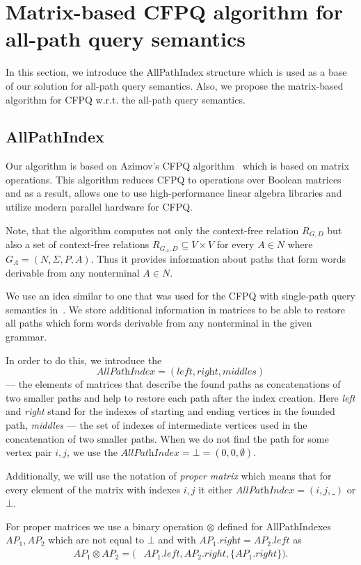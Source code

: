 \section{Matrix-based CFPQ algorithm for all-path query semantics}
\label{sec:all-path-algo}
In this section, we introduce the AllPathIndex structure which is used as a base of our solution for all-path query semantics. Also, we propose the matrix-based algorithm for CFPQ w.r.t. the all-path query semantics.

\subsection{AllPathIndex}
Our algorithm is based on Azimov's CFPQ algorithm~\cite{Azimov:2018:CPQ:3210259.3210264} which is based on matrix operations.
This algorithm reduces CFPQ to operations over Boolean matrices and as a result, allows one to use high-performance linear algebra libraries and utilize modern parallel hardware for CFPQ.

Note, that the algorithm computes not only the context-free relation $R_{G,D}$ but also a set of context-free relations $R_{G_A,D} \subseteq V \times V$ for every $A \in N$ where $G_A = (N, \Sigma, P, A)$.
Thus it provides information about paths that form words derivable from any nonterminal $A \in N$.

We use an idea similar to one that was used for the CFPQ with single-path query semantics in~\cite{10.1145/3398682.3399163}. We store additional information in matrices to be able to restore all paths which form words derivable from any nonterminal in the given grammar.

In order to do this, we introduce the 
$$\textit{AllPathIndex} = (\textit{left},\textit{right},\textit{middles})$$ 
--- the elements of matrices that describe the found paths as concatenations of two smaller paths and help to restore each path after the index creation. Here \textit{left} and \textit{right} stand for the indexes of starting and ending vertices in the founded path, \textit{middles} --- the set of indexes of intermediate vertices used in the concatenation of two smaller paths. When we do not find the path for some vertex pair $i,j$, we use the $\textit{AllPathIndex} = \bot = (0,0,\emptyset)$.

Additionally, we will use the notation of \textit{proper matrix} which means that for every element of the matrix with indexes $i,j$ it either $\textit{AllPathIndex} = (i,j,\_)$ or $\bot$.

For proper matrices we use a binary operation $\otimes$ defined for AllPathIndexes \mbox{$AP_1, AP_2$} which are not equal to $\bot$ and with $AP_1.\textit{right} = AP_2.\textit{left}$ as
\begin{align*}
	AP_1 \otimes AP_2 = (&AP_1.left, AP_2.right, \{AP_1.right\}).
\end{align*}


